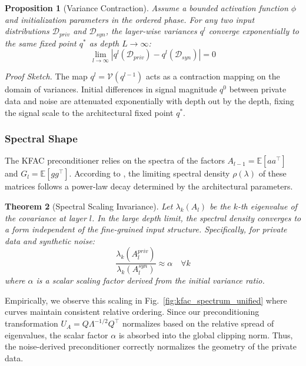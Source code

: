 \documentclass{article}
\theoremstyle{plain}
\newtheorem{theorem}{Theorem}[section]
\newtheorem{proposition}[theorem]{Proposition}
\theoremstyle{definition}
\theoremstyle{remark}
\begin{document}
\begin{proposition}[Variance Contraction]
\label{prop:variance_contraction}
Assume a bounded activation function $\phi$ and initialization parameters in the ordered phase. For any two input distributions $\mathcal{D}_{priv}$ and $\mathcal{D}_{syn}$, the layer-wise variances $q^l$ converge exponentially to the same fixed point $q^*$ as depth $L \to \infty$:
\begin{equation}
    \lim_{l \to \infty} |q^l(\mathcal{D}_{priv}) - q^l(\mathcal{D}_{syn})| = 0
\end{equation}
\end{proposition}
\textit{Proof Sketch.} The map $q^l = \mathcal{V}(q^{l-1})$ acts as a contraction mapping on the domain of variances. Initial differences in signal magnitude $q^0$ between private data and noise are attenuated exponentially with depth out by the depth, fixing the signal scale to the architectural fixed point $q^*$.

\subsubsection{Spectral Shape}
The KFAC preconditioner relies on the spectra of the factors $A_{l-1} = \mathbb{E}[a a^\top]$ and $G_l = \mathbb{E}[g g^\top]$. According to \citet{pmlr-v70-pennington17a}, the limiting spectral density $\rho(\lambda)$ of these matrices follows a power-law decay determined by the architectural parameters.

\begin{theorem}[Spectral Scaling Invariance]
Let $\lambda_k(A_l)$ be the $k$-th eigenvalue of the covariance at layer $l$. In the large depth limit, the spectral density converges to a form independent of the fine-grained input structure. Specifically, for private data and synthetic noise:
\begin{equation}
    \frac{\lambda_k(A_l^{priv})}{\lambda_k(A_l^{syn})} \approx \alpha \quad \forall k
\end{equation}
where $\alpha$ is a scalar scaling factor derived from the initial variance ratio.
\end{theorem}
Empirically, we observe this scaling in Fig.~\ref{fig:kfac_spectrum_unified} where curves maintain consistent relative ordering. Since our preconditioning transformation $U_A = Q \Lambda^{-1/2} Q^\top$ normalizes based on the relative spread of eigenvalues, the scalar factor $\alpha$ is absorbed into the global clipping norm. Thus, the noise-derived preconditioner correctly normalizes the geometry of the private data.
\end{document}
